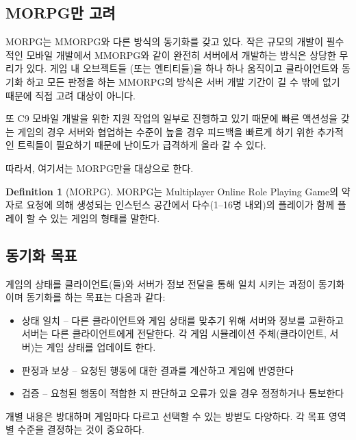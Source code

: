 \documentclass[ %
    a4paper,    %
    amsmath,    %
    itemph,     %
]{oblivoir}     %
\theoremstyle{definition}
\newtheorem{dfn}{Definition}[section]
\theoremstyle{remark}
\theoremstyle{plain}
\begin{document}
\subsection{MORPG만 고려}
MORPG는 MMORPG와 다른 방식의 동기화를 갖고 있다. 작은 규모의 개발이 필수적인 모바일 개발에서
MMORPG와 같이 완전히 서버에서 개발하는 방식은 상당한 무리가 있다. 게임 내 오브젝트들 (또는 엔티티들)을
하나 하나 움직이고 클라이언트와 동기화 하고 모든 판정을 하는 MMORPG의 방식은 서버 개발 기간이
길 수 밖에 없기 때문에 직접 고려 대상이 아니다.

또 C9 모바일 개발을 위한 지원 작업의 일부로 진행하고 있기 때문에 빠른 액션성을 갖는 게임의 경우
서버와 협업하는 수준이 높을 경우 피드백을 빠르게 하기 위한 추가적인 트릭들이 필요하기 때문에
난이도가 급격하게 올라 갈 수 있다.

따라서, 여기서는 MORPG만을 대상으로 한다.

\begin{tcolorbox}[colback=green!5,colframe=green!40!black,title=MORPG]
\begin{dfn}[MORPG]
MORPG는 Multiplayer Online Role Playing Game의 약자로 요청에 의해 생성되는 인스턴스 공간에서
다수(1--16명 내외)의 플레이가 함께 플레이 할 수 있는 게임의 형태를 말한다.
\end{dfn}
\end{tcolorbox}

\subsection{동기화 목표}
게임의 상태를 클라이언트(들)와 서버가 정보 전달을 통해 일치 시키는 과정이 동기화이며 동기화를 하는 목표는
다음과 같다:
\begin{tcolorbox}[colback=green!5,colframe=green!40!black,title=동기화 목표]
\begin{itemize}
  \item{상태 일치} -- 다른 클라이언트와 게임 상태를 맞추기 위해 서버와 정보를 교환하고
  서버는 다른 클라이언트에게 전달한다. 각 게임 시뮬레이션 주체(클라이언트, 서버)는 게임 상태를 업데이트 한다.
  \item{판정과 보상} -- 요청된 행동에 대한 결과를 계산하고 게임에 반영한다
  \item{검증} -- 요청된 행동이 적합한 지 판단하고 오류가 있을 경우 정정하거나 통보한다
\end{itemize}
\end{tcolorbox}

개별 내용은 방대하며 게임마다 다르고 선택할 수 있는 방벋도 다양하다. 각 목표 영역별 수준을 결정하는 것이 중요하다.
\end{document}
